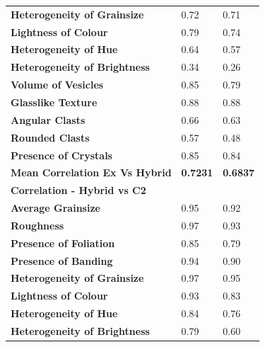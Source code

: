 \begin{longtable}[c]{@{}lll@{}}
\textbf{Heterogeneity of Grainsize} &
  \cellcolor[HTML]{ACB9CA}0.72 &
  \cellcolor[HTML]{FFE699}0.71 \\
\textbf{Lightness of Colour} &
  \cellcolor[HTML]{ACB9CA}0.79 &
  \cellcolor[HTML]{FFE699}0.74 \\
\textbf{Heterogeneity of Hue} &
  \cellcolor[HTML]{ACB9CA}0.64 &
  \cellcolor[HTML]{FFE699}0.57 \\
\textbf{Heterogeneity of Brightness} &
  \cellcolor[HTML]{ACB9CA}0.34 &
  \cellcolor[HTML]{FFE699}0.26 \\
\textbf{Volume of Vesicles} &
  \cellcolor[HTML]{ACB9CA}0.85 &
  \cellcolor[HTML]{FFE699}0.79 \\
\textbf{Glasslike Texture} &
  \cellcolor[HTML]{ACB9CA}0.88 &
  \cellcolor[HTML]{FFE699}0.88 \\
\textbf{Angular Clasts} &
  \cellcolor[HTML]{ACB9CA}0.66 &
  \cellcolor[HTML]{FFE699}0.63 \\
\textbf{Rounded Clasts} &
  \cellcolor[HTML]{ACB9CA}0.57 &
  \cellcolor[HTML]{FFE699}0.48 \\
\textbf{Presence of Crystals} &
  \cellcolor[HTML]{ACB9CA}0.85 &
  \cellcolor[HTML]{FFE699}0.84 \\
\cellcolor[HTML]{FFFF00}\textbf{Mean Correlation Ex Vs Hybrid} &
  \textbf{0.7231} &
  \textbf{0.6837} \\
\rowcolor[HTML]{E7E6E6} 
\textbf{Correlation -   Hybrid vs C2} &
  \textbf{} &
  \textbf{} \\
\textbf{Average   Grainsize} &
  \cellcolor[HTML]{ACB9CA}0.95 &
  \cellcolor[HTML]{FFE699}0.92 \\
\textbf{Roughness} &
  \cellcolor[HTML]{ACB9CA}0.97 &
  \cellcolor[HTML]{FFE699}0.93 \\
\textbf{Presence of Foliation} &
  \cellcolor[HTML]{ACB9CA}0.85 &
  \cellcolor[HTML]{FFE699}0.79 \\
\textbf{Presence of Banding} &
  \cellcolor[HTML]{ACB9CA}0.94 &
  \cellcolor[HTML]{FFE699}0.90 \\
\textbf{Heterogeneity of Grainsize} &
  \cellcolor[HTML]{ACB9CA}0.97 &
  \cellcolor[HTML]{FFE699}0.95 \\
\textbf{Lightness of Colour} &
  \cellcolor[HTML]{ACB9CA}0.93 &
  \cellcolor[HTML]{FFE699}0.83 \\
\textbf{Heterogeneity of Hue} &
  \cellcolor[HTML]{ACB9CA}0.84 &
  \cellcolor[HTML]{FFE699}0.76 \\
\textbf{Heterogeneity of Brightness} &
  \cellcolor[HTML]{ACB9CA}0.79 &
  \cellcolor[HTML]{FFE699}0.60 \\

\end{longtable}
